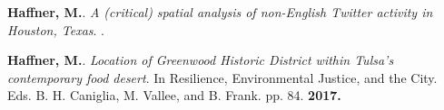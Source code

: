 

\begin{cventries}
   \cventry
      {}
      {}
      {}
      {}
      {
        \begin{cvitems}
          \vspace{-4mm}
        \item
          {\textbf{Haffner, M.}.
            \textit{A (critical) spatial analysis of non-English Twitter activity in Houston, Texas}. \textit{}.} \\
          \vspace{-2mm}
        \end{cvitems}
    }
\end{cventries}



\begin{cventries}
   \cventry
      {}
      {}
      {}
      {}
      {
        \begin{cvitems}
          \vspace{-4mm}
        \item {\textbf{Haffner, M.}.
            \textit{Location of Greenwood Historic District within Tulsa's
              contemporary food desert}. In Resilience, Environmental
              Justice, and the City. Eds. B. H. Caniglia, M. Vallee, and B.
            Frank. pp. 84. \textbf{2017.}} \\
          \vspace{-2mm}
        \end{cvitems}
    }
\end{cventries}